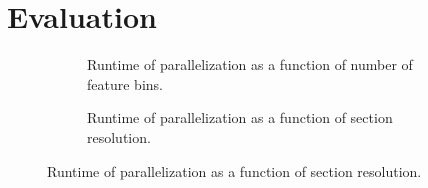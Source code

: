 \documentclass[sigconf,nonacm]{acmart}
\begin{document}

    

        
    
    
    

\section{Evaluation}\label{sec:evaluation}

\begin{figure}
     \centering
     \begin{subfigure}[b]{\linewidth}
         \centering
         
         \caption{Runtime of parallelization as a function of number of feature bins.}
         \label{subfig:nbins}
     \end{subfigure}
     \par\bigskip
     \begin{subfigure}[b]{\linewidth}
         \centering
        
         \caption{Runtime of parallelization as a function of section resolution.}
         \label{subfig:res}
     \end{subfigure}
     \caption{}
    \label{fig:evalplots}
\end{figure}
\begin{figure}
 \centering

 \caption{Runtime of parallelization as a function of section resolution.}
 \label{fig:res}
\end{figure}
\end{document}
